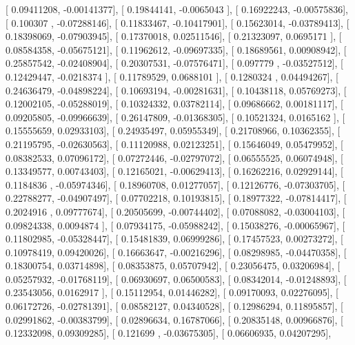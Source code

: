 \documentclass{article}
\begin{document}
       [ 0.09411208, -0.00141377],
       [ 0.19844141, -0.0065043 ],
       [ 0.16922243, -0.00575836],
       [ 0.100307  , -0.07288146],
       [ 0.11833467, -0.10417901],
       [ 0.15623014, -0.03789413],
       [ 0.18398069, -0.07903945],
       [ 0.17370018,  0.02511546],
       [ 0.21323097,  0.0695171 ],
       [ 0.08584358, -0.05675121],
       [ 0.11962612, -0.09697335],
       [ 0.18689561,  0.00908942],
       [ 0.25857542, -0.02408904],
       [ 0.20307531, -0.07576471],
       [ 0.097779  , -0.03527512],
       [ 0.12429447, -0.0218374 ],
       [ 0.11789529,  0.0688101 ],
       [ 0.1280324 ,  0.04494267],
       [ 0.24636479, -0.04898224],
       [ 0.10693194, -0.00281631],
       [ 0.10438118,  0.05769273],
       [ 0.12002105, -0.05288019],
       [ 0.10324332,  0.03782114],
       [ 0.09686662,  0.00181117],
       [ 0.09205805, -0.09966639],
       [ 0.26147809, -0.01368305],
       [ 0.10521324,  0.0165162 ],
       [ 0.15555659,  0.02933103],
       [ 0.24935497,  0.05955349],
       [ 0.21708966,  0.10362355],
       [ 0.21195795, -0.02630563],
       [ 0.11120988,  0.02123251],
       [ 0.15646049,  0.05479952],
       [ 0.08382533,  0.07096172],
       [ 0.07272446, -0.02797072],
       [ 0.06555525,  0.06074948],
       [ 0.13349577,  0.00743403],
       [ 0.12165021, -0.00629413],
       [ 0.16262216,  0.02929144],
       [ 0.1184836 , -0.05974346],
       [ 0.18960708,  0.01277057],
       [ 0.12126776, -0.07303705],
       [ 0.22788277, -0.04907497],
       [ 0.07702218,  0.10193815],
       [ 0.18977322, -0.07814417],
       [ 0.2024916 ,  0.09777674],
       [ 0.20505699, -0.00744402],
       [ 0.07088082, -0.03004103],
       [ 0.09824338,  0.0094874 ],
       [ 0.07934175, -0.05988242],
       [ 0.15038276, -0.00065967],
       [ 0.11802985, -0.05328447],
       [ 0.15481839,  0.06999286],
       [ 0.17457523,  0.00273272],
       [ 0.10978419,  0.09420026],
       [ 0.16663647, -0.00216296],
       [ 0.08298985, -0.04470358],
       [ 0.18300754,  0.03714898],
       [ 0.08353875,  0.05707942],
       [ 0.23056475,  0.03206984],
       [ 0.05257932, -0.01768119],
       [ 0.06930697,  0.06500583],
       [ 0.08342014, -0.01248893],
       [ 0.23543056,  0.0162917 ],
       [ 0.15112954,  0.01446282],
       [ 0.09170093,  0.02276095],
       [ 0.06172726, -0.02781391],
       [ 0.08582127,  0.04340528],
       [ 0.12986294,  0.11895857],
       [ 0.02991862, -0.00383799],
       [ 0.02896634,  0.16787066],
       [ 0.20835148,  0.00966876],
       [ 0.12332098,  0.09309285],
       [ 0.121699  , -0.03675305],
       [ 0.06606935,  0.04207295],
\end{document}
